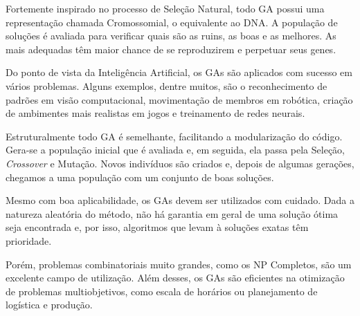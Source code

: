	Fortemente inspirado no processo de Seleção Natural, todo GA possui uma representação chamada Cromossomial, o equivalente ao DNA. A população de soluções é avaliada para verificar quais são as ruins, as boas e as melhores. As mais adequadas têm maior chance de se reproduzirem e perpetuar seus genes.
	
	Do ponto de vista da Inteligência Artificial, os GAs são aplicados com sucesso em vários problemas. Alguns exemplos, dentre muitos, são o reconhecimento de padrões em visão computacional, movimentação de membros em robótica, criação de ambimentes mais realistas em jogos e treinamento de redes neurais. 
	
	Estruturalmente todo GA é semelhante, facilitando a modularização do código. Gera-se a população inicial que é avaliada e, em seguida, ela passa pela Seleção, \textit{Crossover} e Mutação. Novos indivíduos são criados e, depois de algumas gerações, chegamos a uma população com um conjunto de boas soluções.
	
	Mesmo com boa aplicabilidade, os GAs devem ser utilizados com cuidado. Dada a natureza aleatória do método, não há garantia em geral de uma solução ótima seja encontrada e, por isso, algoritmos que levam à soluções exatas têm prioridade.
	
	Porém, problemas combinatoriais muito grandes, como os NP Completos, são um excelente campo de utilização. Além desses, os GAs são eficientes na otimização de problemas multiobjetivos, como escala de horários ou planejamento de logística e produção.



